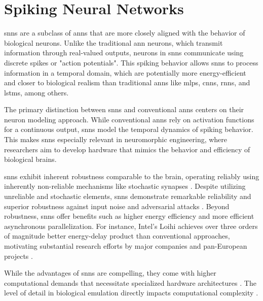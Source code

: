 \section{Spiking Neural Networks}


\glspl{snn} are a subclass of \glspl{ann} that are more closely aligned with the behavior of biological neurons. Unlike the traditional \gls{ann} neurons, which transmit information through real-valued outputs, neurons in \glspl{snn} communicate using discrete spikes or "action potentials". This spiking behavior allows \glspl{snn} to process information in a temporal domain, which are potentially more energy-efficient and closer to biological realism than traditional \glspl{ann} like \glspl{mlp}, \glspl{cnn}, \glspl{rnn}, and \glspl{lstm}, among others.

The primary distinction between \glspl{snn} and conventional \glspl{ann} centers on their neuron modeling approach. While conventional \glspl{ann} rely on activation functions for a continuous output, \glspl{snn} model the temporal dynamics of spiking behavior. This makes \glspl{snn} especially relevant in neuromorphic engineering, where researchers aim to develop hardware that mimics the behavior and efficiency of biological brains.

\glspl{snn} exhibit inherent robustness comparable to the brain, operating reliably using inherently non-reliable mechanisms like stochastic synapses \cite{smetters1996synaptic}. Despite utilizing unreliable and stochastic elements, \glspl{snn} demonstrate remarkable reliability \cite{mcdonnell2011benefits} and superior robustness against input noise and adversarial attacks \cite{ernst2007efficient, Dapello2020.06.16.154542}. Beyond robustness, \glspl{snn} offer benefits such as higher energy efficiency and more efficient asynchronous parallelization. For instance, Intel's Loihi \cite{davies2018loihi} achieves over three orders of magnitude better energy-delay product than conventional approaches, motivating substantial research efforts by major companies and pan-European projects \cite{Spinnaker_TransSolid_13}.

While the advantages of \glspl{snn} are compelling, they come with higher computational demands that necessitate specialized hardware architectures \cite{roy2019towards, bouvier2019spiking, young2019review, TrueNorth_Trans15, Spinnaker_TransSolid_13, davies2018loihi}. The level of detail in biological emulation directly impacts computational complexity \cite{izhikevich2004model, amunts2019human}.

